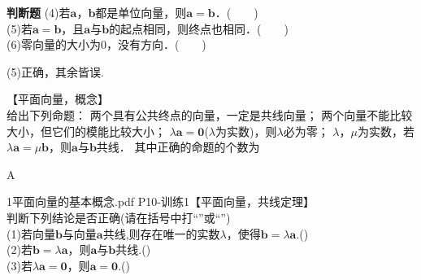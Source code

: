 \begin{exercise}{\textbf{判断题}}
      (4)若$\bm a$，$\bm b$都是单位向量，则$\bm a=\bm b$．(　　)\\
      (5)若$\bm a=\bm b$，且$\bm a$与$\bm b$的起点相同，则终点也相同．(　　)\\
      (6)零向量的大小为0，没有方向．(　　)
      \begin{answer}
        (5)正确，其余皆误.
      \end{answer}
    \item 【平面向量，概念】\\
      给出下列命题：
      两个具有公共终点的向量，一定是共线向量；
      两个向量不能比较大小，但它们的模能比较大小；
      $\lambda\bm{a}=\bm{0}$($\lambda$为实数)，则$\lambda$必为零；
      $\lambda$，$\mu$为实数，若$\lambda\bm{a}=\mu\bm{b}$，则$\bm{a}$与$\bm{b}$共线．
      其中正确的命题的个数为\xz
      \begin{answer}
        A
      \end{answer}
    \item 1平面向量的基本概念.pdf P10-训练1【平面向量，共线定理】\\
      判断下列结论是否正确(请在括号中打“\checkmark”或“\XSolidBrush”)\\
      (1)若向量$\bm b$与向量$\bm{a}$共线,则存在唯一的实数$ \lambda $，使得$\bm{b}=\lambda\bm{a}$.(\hspace{2em})\\
      (2)若$\bm{b}=\lambda\bm{a}$，则$\bm a$与$\bm b$共线.(\hspace{2em})\\
      (3)若$\lambda\bm a=\bm 0$，则$\bm a=\bm 0$.(\hspace{2em})\\
  \end{exercise}
